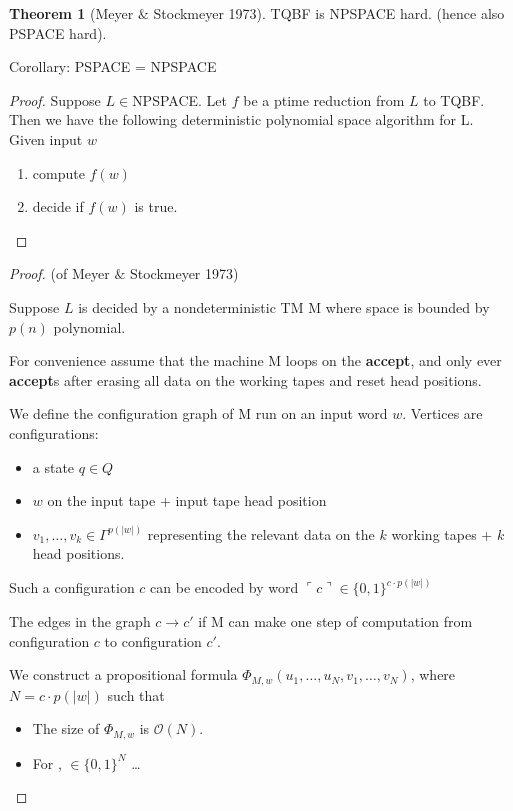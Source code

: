 \documentclass[a4paper,12pt]{article}
\theoremstyle{definition}
\newtheorem{theorem}[counter]{Theorem}
\theoremstyle{remark}
\begin{document}
\begin{theorem}[Meyer $\&$ Stockmeyer 1973]
    TQBF is NPSPACE hard. (hence also PSPACE hard).
\end{theorem}
Corollary: PSPACE = NPSPACE
\begin{proof}
    Suppose $L \in $NPSPACE. Let $f$ be a ptime reduction from $L$ to TQBF. Then we have the following deterministic polynomial space algorithm
    for L. Given input $w$
    \begin{enumerate}
        \item compute $f(w)$
        \item decide if $f(w)$ is true.
    \end{enumerate}
\end{proof}


\begin{proof}
    (of Meyer $\&$ Stockmeyer 1973)

    Suppose $L$ is decided by a nondeterministic TM M where space is bounded by $p(n)$ polynomial.
    
    For convenience assume that the machine M loops on the \textbf{accept}, and only ever \textbf{accept}s after erasing all data on the working tapes
     and reset head positions.
    
    We define the configuration graph of M run on an input word $w$. Vertices are configurations:
    \begin{itemize}
        \item a state $q \in Q$
        \item $w$ on the input tape + input tape head position
        \item $v_1, \dots, v_k \in \Gamma^{p(|w|)}$ representing the relevant data on the $k$ working tapes + $k$ head positions. 
    \end{itemize}
    
    Such a configuration $c$ can be encoded by word $\ulcorner c \urcorner \in \{0, 1\}^{c \cdot p(|w|)}$
    
    The edges in the graph $c \to c'$ if M can make one step of computation from configuration $c$ to configuration $c'$.
    
    We construct a propositional formula $\Phi_{M, w}(u_1, \dots, u_N, v_1, \dots, v_N)$, where $N = c \cdot p(|w|)$ such that
    \begin{itemize}
        \item The size of $\Phi_{M, w}$ is $\mathscr{O}(N)$.
        \item For ,  $\in \{0, 1\}^N$ \dots
        

\end{itemize}
\end{proof}
\end{document}
